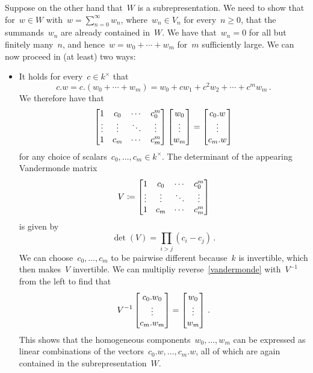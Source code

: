 Suppose on the other hand that~$W$ is a subrepresentation.
We need to show that for~$w \in W$ with~$w = \sum_{n=0}^\infty w_n$, where~$w_n \in V_n$ for every~$n \geq 0$, that the summands~$w_n$ are already contained in~$W$.
We have that~$w_n = 0$ for all but finitely many~$n$, and hence~$w = w_0 + \dotsb + w_m$ for~$m$ sufficiently large.
We can now proceed in (at least) two ways:
\begin{itemize}
  \item
    It holds for every~$c \in k^\times$ that
    \[
          c.w
      =   c.(w_0 + \dotsb + w_m)
      =   w_0 + c w_1 + c^2 w_2 + \dotsb + c^m w_m \,.
    \]
    We therefore have that
    \begin{equation}
      \label{vandermonde}
      \begin{bmatrix}
        1       & c_0     & \cdots  & c_0^m   \\
        \vdots  & \vdots  & \ddots  & \vdots  \\
        1       & c_m     & \cdots  & c_m^m
      \end{bmatrix}
      \begin{bmatrix} w_0 \\ \vdots \\ w_m \end{bmatrix}
      =
      \begin{bmatrix} c_0.w \\ \vdots \\ c_m.w \end{bmatrix}
    \end{equation}
    for any choice of scalars~$c_0, \dotsc, c_m \in k^\times$.
    The determinant of the appearing Vandermonde matrix
    \[
                V
      \coloneqq  \begin{bmatrix}
                  1       & c_0     & \cdots  & c_0^m   \\
                  \vdots  & \vdots  & \ddots  & \vdots  \\
                  1       & c_m     & \cdots  & c_m^m
                \end{bmatrix}
    \]
    is given by
    \[
            \det(V)
      =     \prod_{i > j} (c_i - c_j) \,.
    \]
    We can choose~$c_0, \dotsc, c_m$ to be pairwise different because~$k$ is invertible, which then makes~$V$ invertible.
    We can multipliy reverse~\eqref{vandermonde} with~$V^{-1}$ from the left to find that
    \[
        V^{-1}
        \begin{bmatrix} c_0.w_0 \\ \vdots \\ c_m.w_m \end{bmatrix}
      = \begin{bmatrix} w_0 \\ \vdots \\ w_m \end{bmatrix} \,.
    \]
    This shows that the homogeneous components~$w_0, \dotsc, w_m$ can be expressed as linear combinations of the vectors~$c_0.w, \dotsc, c_m.w$, all of which are again contained in the subrepresentation~$W$.

\end{itemize}
